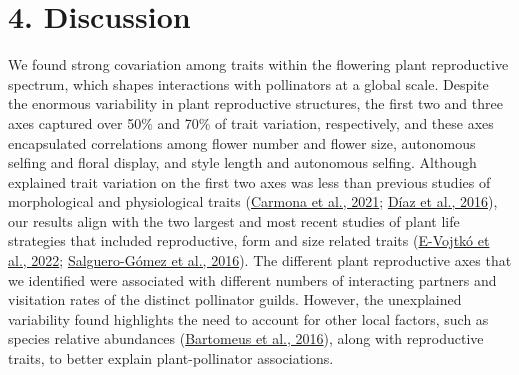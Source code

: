 \documentclass[
  12pt,
  a4paper,
]{article}
\begin{document}
\hypertarget{discussion}{%
\section{4. Discussion}\label{discussion}}

We found strong covariation among traits within the flowering plant reproductive spectrum, which shapes interactions with pollinators at a global scale. Despite the enormous variability in plant reproductive structures, the first two and three axes captured over 50\% and 70\% of trait variation, respectively, and these axes encapsulated correlations among flower number and flower size, autonomous selfing and floral display, and style length and autonomous selfing. Although explained trait variation on the first two axes was less than previous studies of morphological and physiological traits (\protect\hyperlink{ref-carmona2021}{Carmona et al., 2021}; \protect\hyperlink{ref-diaz2016}{Díaz et al., 2016}), our results align with the two largest and most recent studies of plant life strategies that included reproductive, form and size related traits (\protect\hyperlink{ref-vojtko2022}{E-Vojtkó et al., 2022}; \protect\hyperlink{ref-salguero2016}{Salguero-Gómez et al., 2016}). The different plant reproductive axes that we identified were associated with different numbers of interacting partners and visitation rates of the distinct pollinator guilds. However, the unexplained variability found highlights the need to account for other local factors, such as species relative abundances (\protect\hyperlink{ref-bartomeus2016}{Bartomeus et al., 2016}), along with reproductive traits, to better explain plant-pollinator associations.
\end{document}
